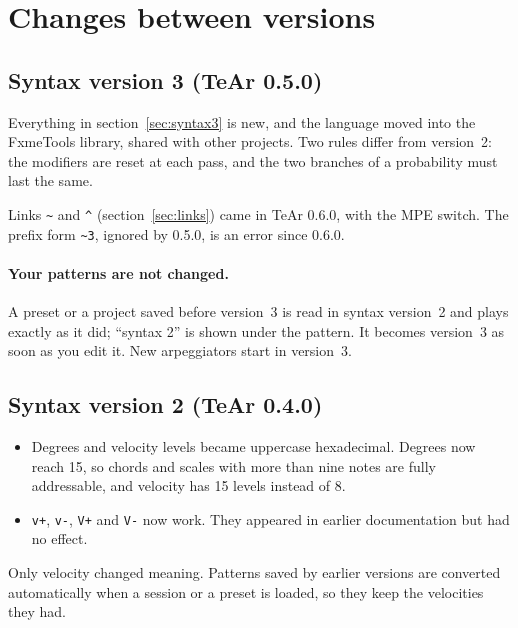 \documentclass[11pt,a4paper]{article}
\newcommand{\pat}[1]{\texttt{#1}}
\begin{document}
\section{Changes between versions}
\label{sec:changes}

\subsection{Syntax version 3 (TeAr 0.5.0)}

Everything in section~\ref{sec:syntax3} is new, and the language moved into the
FxmeTools library, shared with other projects. Two rules differ from version~2:
the modifiers are reset at each pass, and the two branches of a probability must
last the same.

Links \pat{\textasciitilde} and \pat{\textasciicircum}
(section~\ref{sec:links}) came in TeAr 0.6.0, with the MPE switch. The prefix
form \pat{\textasciitilde3}, ignored by 0.5.0, is an error since 0.6.0.

\paragraph{Your patterns are not changed.} A preset or a project saved before
version~3 is read in syntax version~2 and plays exactly as it did; ``syntax 2''
is shown under the pattern. It becomes version~3 as soon as you edit it. New
arpeggiators start in version~3.

\subsection{Syntax version 2 (TeAr 0.4.0)}

\begin{itemize}[leftmargin=1.5em]
  \item Degrees and velocity levels became uppercase hexadecimal. Degrees now
        reach 15, so chords and scales with more than nine notes are fully
        addressable, and velocity has 15 levels instead of 8.
  \item \pat{v+}, \pat{v-}, \pat{V+} and \pat{V-} now work. They appeared in
        earlier documentation but had no effect.
\end{itemize}

Only velocity changed meaning. Patterns saved by earlier versions are converted
automatically when a session or a preset is loaded, so they keep the velocities
they had.
\end{document}
